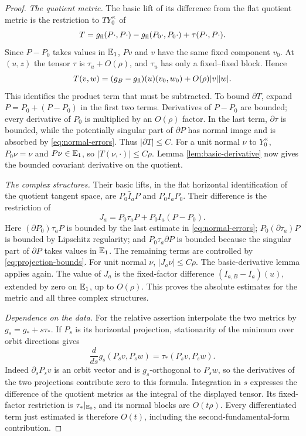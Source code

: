 \begin{proof}
\emph{The quotient metric.}
The basic lift of its difference from the flat quotient metric is
the restriction to $TY_0^\times$ of
\[
 T=g_{\mathrm{fl}}(P\cdot,P\cdot)-g_{\mathrm{fl}}(P_0\cdot,P_0\cdot)
       +\tau(P\cdot,P\cdot).
\]
Since $P-P_0$ takes values in $\mathbb E_1$, $Pv$ and $v$ have
the same fixed component $v_0$. At $(u,z)$ the tensor
$\tau$ is $\tau_u+O(\rho)$, and $\tau_u$ has only a
fixed--fixed block. Hence
\[
 T(v,w)=(g_B-g_{\mathrm{fl}})(u)(v_0,w_0)+O(\rho)|v||w|.
\]
This identifies the product term that must be subtracted. To
bound $\partial T$, expand $P=P_0+(P-P_0)$ in the first
two terms. Derivatives of $P-P_0$ are bounded; every derivative
of $P_0$ is multiplied by an $O(\rho)$ factor. In the last
term, $\partial\tau$ is bounded, while the potentially
singular part of $\partial P$ has normal image and is absorbed
by \eqref{eq:normal-errors}. Thus $|\partial T|\le C$.
For a unit normal $\nu$ to $Y_0^\times$, $P_0\nu=\nu$
and $P\nu\in\mathbb E_1$, so $|T(\nu,\cdot)|\le C\rho$.
Lemma \ref{lem:basic-derivative} now gives the bounded
covariant derivative on the quotient.

\emph{The complex structures.}
Their basic lifts, in the flat horizontal identification of the
quotient tangent space, are $P_0\widehat I_aP$ and
$P_0I_aP_0$. Their difference is the restriction of
\[
 J_a=P_0\tau_aP+P_0I_a(P-P_0).
\]
Here $(\partial P_0)\tau_aP$ is bounded by the last estimate
in \eqref{eq:normal-errors}; $P_0(\partial\tau_a)P$ is
bounded by Lipschitz regularity; and $P_0\tau_a\partial P$
is bounded because the singular part of $\partial P$ takes
values in $\mathbb E_1$. The remaining terms are controlled by
\eqref{eq:projection-bounds}. For unit normal $\nu$,
$|J_a\nu|\le C\rho$. The basic-derivative lemma applies
again. The value of $J_a$ is the fixed-factor difference
$(I_{a,B}-I_a)(u)$, extended by zero on $\mathbb E_1$, up to
$O(\rho)$. This proves the absolute estimates for the metric
and all three complex structures.

\emph{Dependence on the data.}
For the relative assertion interpolate the two metrics by
$g_s=g_*+s\tau_*$. If $P_s$ is its horizontal projection,
stationarity of the minimum over orbit directions gives
\[
 \frac{d}{ds}g_s(P_sv,P_sw)=\tau_*(P_sv,P_sw).
\]
Indeed $\partial_sP_sv$ is an orbit vector and is
$g_s$-orthogonal to $P_sw$, so the derivatives of the two
projections contribute zero to this formula. Integration in $s$
expresses the difference of the quotient metrics as the integral
of the displayed tensor. Its fixed-factor restriction is
$\tau_*|_{\mathbb E_0}$, and its normal blocks are $O(t\rho)$.
Every differentiated term just estimated is therefore $O(t)$,
including the second-fundamental-form contribution.


\end{proof}
